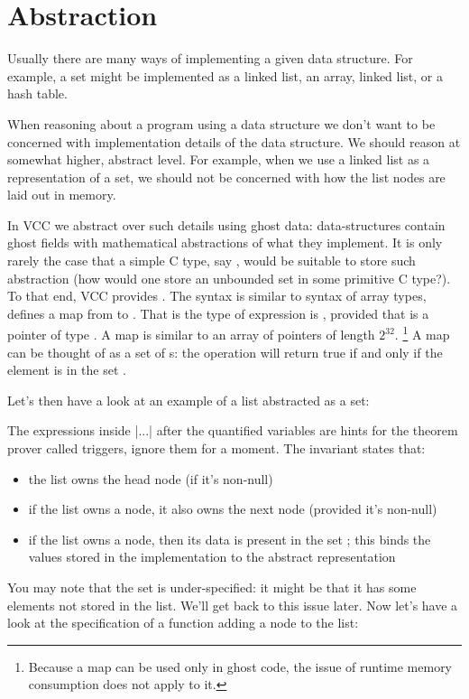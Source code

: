 \section{Abstraction}

Usually there are many ways of implementing a given data structure.
For example, a set might be implemented as a linked list, an array, linked list, or a hash table.

When reasoning about a program using a data structure we don't want to be
concerned with implementation details of the data structure.
We should reason at somewhat higher, abstract level.
For example, when we use a linked list as a representation of a set, we should not be concerned
with how the list nodes are laid out in memory.

In VCC we abstract over such details using ghost data: data-structures contain ghost fields with mathematical
abstractions of what they implement.
It is only rarely the case that a simple C type, say , would be suitable
to store such abstraction (how would one store an unbounded set in some primitive C type?).
To that end, VCC provides .
The syntax is similar to syntax of array types,  defines a map  from 
to .
That is the type of expression  is , provided that  is a pointer
of type .
A map  is similar to an array of pointers of length $2^{32}$.%
\footnote{
  Because a map can be used only in ghost code, 
  the issue of runtime memory consumption does not apply to it.}
A map  can be thought of as a set of s: the operation
 will return true if and only if the element  is in the set .

Let's then have a look at an example of a list abstracted as a set:


\noindent
The expressions inside \vcc|{...}| after the quantified variables are hints for
the theorem prover called triggers, ignore them for a moment.
The invariant states that:
\begin{itemize}
\item the list owns the head node (if it's non-null)
\item if the list owns a node, it also owns the next node (provided it's non-null)
\item if the list owns a node, then its data is present in the set ;
      this binds the values stored in the implementation to the abstract representation
\end{itemize}
You may note that the set  is under-specified: 
it might be that it has some elements not stored in the list.
We'll get back to this issue later.
Now let's have a look at the specification of a function adding a
node to the list:

